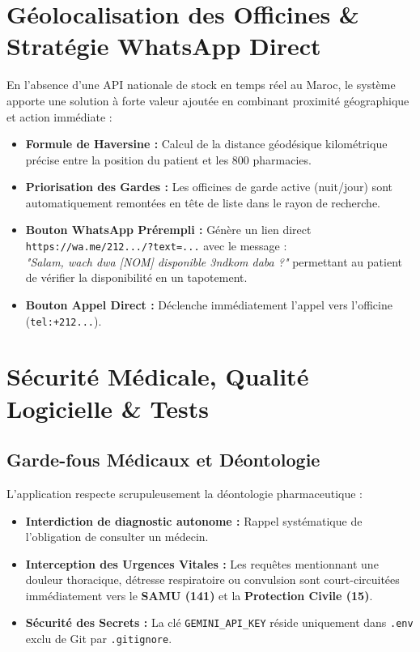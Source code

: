 \documentclass[a4paper,10pt]{article}
\begin{document}
\section{Géolocalisation des Officines \& Stratégie WhatsApp Direct}

En l'absence d'une API nationale de stock en temps réel au Maroc, le système apporte une solution à forte valeur ajoutée en combinant proximité géographique et action immédiate :

\begin{itemize}[leftmargin=*]
    \item \textbf{Formule de Haversine :} Calcul de la distance géodésique kilométrique précise entre la position du patient et les 800 pharmacies.
    \item \textbf{Priorisation des Gardes :} Les officines de garde active (nuit/jour) sont automatiquement remontées en tête de liste dans le rayon de recherche.
    \item \textbf{Bouton WhatsApp Prérempli :} Génère un lien direct \texttt{https://wa.me/212.../?text=...} avec le message : \\
    \textit{"Salam, wach dwa [NOM] disponible 3ndkom daba ?"} permettant au patient de vérifier la disponibilité en un tapotement.
    \item \textbf{Bouton Appel Direct :} Déclenche immédiatement l'appel vers l'officine (\texttt{tel:+212...}).
\end{itemize}

\section{Sécurité Médicale, Qualité Logicielle \& Tests}

\subsection{Garde-fous Médicaux et Déontologie}
L'application respecte scrupuleusement la déontologie pharmaceutique :
\begin{itemize}[leftmargin=*]
    \item \textbf{Interdiction de diagnostic autonome :} Rappel systématique de l'obligation de consulter un médecin.
    \item \textbf{Interception des Urgences Vitales :} Les requêtes mentionnant une douleur thoracique, détresse respiratoire ou convulsion sont court-circuitées immédiatement vers le \textbf{SAMU (141)} et la \textbf{Protection Civile (15)}.
    \item \textbf{Sécurité des Secrets :} La clé \texttt{GEMINI\_API\_KEY} réside uniquement dans \texttt{.env} exclu de Git par \texttt{.gitignore}.
\end{itemize}
\end{document}
